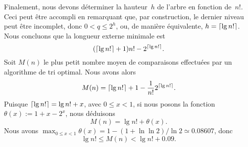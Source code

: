Finalement, nous devons déterminer la hauteur~\(h\) de l'arbre en
fonction de~\(n!\). Ceci peut être accompli en remarquant que, par
construction, le dernier niveau peut être incomplet, donc \(0 < q
\leqslant 2^h\), ou, de manière équivalente, \(h = \lceil{\lg
  n!}\rceil\). Nous concluons que la longueur externe minimale est
\begin{equation*}
(\lceil{\lg n!}\rceil + 1) n! - 2^{\lceil{\lg n!}\rceil}.
\end{equation*}
Soit \(M(n)\) \label{def:Mn} le plus petit nombre moyen de
comparaisons effectuées par un algorithme de tri optimal. Nous avons
alors
\begin{equation*}
M(n) = \lceil{\lg n!}\rceil + 1 - \frac{1}{n!}2^{\lceil{\lg n!}\rceil}.
\end{equation*}
Puisque \(\lceil{\lg n!}\rceil = \lg n! + x\), avec \(0 \leqslant x < 1\),
si nous posons la fonction \(\theta(x) := 1 + x - 2^x\), nous
déduisons
\begin{equation*}
M(n) = \lg n! + \theta(x).
\end{equation*}
Nous avons \(\max_{0\leqslant x < 1}\theta(x) = 1 - (1 + \ln\ln
2)/\!\ln 2 \simeq 0.08607\), donc
\begin{equation}
\lg n! \leqslant M(n) < \lg n! + 0.09.
\label{ineq:Mn}
\end{equation}
